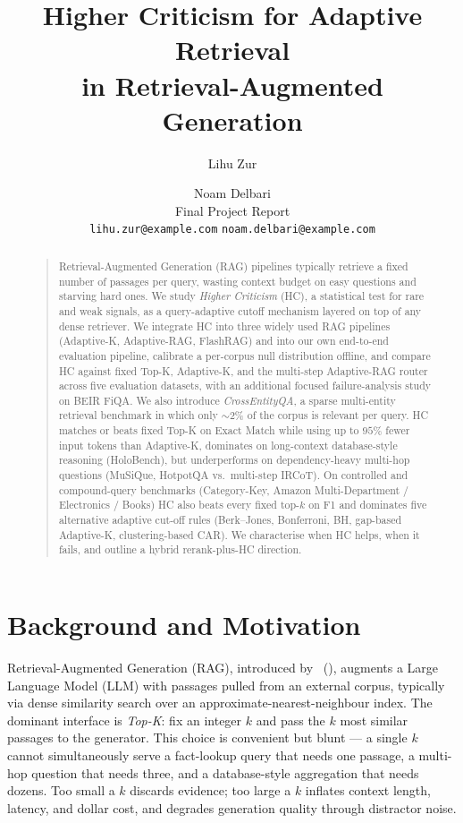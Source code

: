 \documentclass[letterpaper]{article}
\title{Higher Criticism for Adaptive Retrieval\\in Retrieval-Augmented Generation}
\author{Lihu Zur \and Noam Delbari\\
Final Project Report\\
\texttt{lihu.zur@example.com} \quad \texttt{noam.delbari@example.com}\\
}
\begin{document}
\maketitle

\begin{abstract}
\begin{quote}
Retrieval-Augmented Generation (RAG) pipelines typically retrieve a
fixed number of passages per query, wasting context budget on easy
questions and starving hard ones. We study \emph{Higher Criticism}
(HC), a statistical test for rare and weak signals, as a
query-adaptive cutoff mechanism layered on top of any dense retriever.
We integrate HC into three widely used RAG pipelines (Adaptive-K,
Adaptive-RAG, FlashRAG) and into our own end-to-end evaluation
pipeline, calibrate a per-corpus null distribution offline, and
compare HC against fixed Top-K, Adaptive-K, and the multi-step
Adaptive-RAG router across five evaluation datasets, with an
additional focused failure-analysis study on BEIR FiQA. We also
introduce \emph{CrossEntityQA}, a sparse multi-entity retrieval
benchmark in which only $\sim$2\% of the corpus is relevant per query.
HC matches or beats fixed Top-K on Exact Match while using up to
$95\%$ fewer input tokens than Adaptive-K, dominates on long-context
database-style reasoning (HoloBench), but underperforms on
dependency-heavy multi-hop questions (MuSiQue, HotpotQA vs.\
multi-step IRCoT). On controlled and compound-query benchmarks
(Category-Key, Amazon Multi-Department / Electronics / Books) HC
also beats every fixed top-$k$ on F1 and dominates five alternative
adaptive cut-off rules (Berk--Jones, Bonferroni, BH, gap-based
Adaptive-K, clustering-based CAR). We characterise when HC helps,
when it fails, and outline a hybrid rerank-plus-HC direction.
\end{quote}
\end{abstract}

\section{Background and Motivation}

Retrieval-Augmented Generation (RAG), introduced by
\citeauthor{lewis2020rag}~(\citeyear{lewis2020rag}), augments a Large
Language Model (LLM) with passages pulled from an external corpus,
typically via dense similarity search over an
approximate-nearest-neighbour index. The
dominant interface is \emph{Top-K}: fix an integer $k$ and pass the
$k$ most similar passages to the generator. This choice is convenient
but blunt --- a single $k$ cannot simultaneously serve a fact-lookup
query that needs one passage, a multi-hop question that needs three,
and a database-style aggregation that needs dozens. Too small a $k$
discards evidence; too large a $k$ inflates context length, latency,
and dollar cost, and degrades generation quality through distractor
noise.
\end{document}
